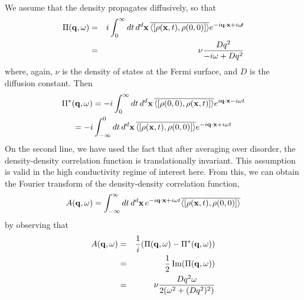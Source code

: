 \documentclass[prb,twocolumn]{revtex4}
\begin{document}
We assume that the density propagates diffusively, so that
\begin{eqnarray}
\Pi({\bf q},\omega)&=&i\int^{\infty}_{0}dt\,{d^d}{\bf x}\,\overline{\left\langle[\rho({\bf x},t),\rho(0,0)]\right\rangle}e^{-i{\bf q}\cdot{\bf x}+i\omega\!t}\cr
&=&\nu\frac{Dq^2}{-i\omega +Dq^2}
\end{eqnarray}
where, again, $\nu$ is the density of states at the Fermi surface, and $D$ is the diffusion
constant. Then
\begin{multline}
\Pi^{*}({\bf q},\omega) = -i\int^{\infty}_{0}dt\,{d^d}{\bf x}\,\overline{\left\langle[\rho(0,0),\rho({\bf x},t)]\right\rangle}e^{i{\bf q}\cdot{\bf x}-i\omega t}\\
=-i\int_{-\infty}^{0}dt\,{d^d}{\bf x}\,\overline{\left\langle[\rho({\bf x},t),\rho(0,0)]\right\rangle}
e^{-i{\bf q}\cdot{\bf x}+i\omega t}
\end{multline}
On the second line, we have used the fact that after averaging
over disorder, the density-density correlation function is
translationally invariant. This assumption is valid in the high
conductivity regime of interest here.
From this, we can obtain the Fourier transform of the density-density correlation function,
\begin{equation}
A({\bf q},\omega)=\int^{\infty}_{-\infty}dt\, {d^d}{\bf x}\,
e^{-i{\bf q}\cdot{\bf x}+i\omega t}\overline{\left\langle[\rho({\bf x},t),\rho(0,0)]\right\rangle}
\end{equation}
by observing that
\begin{eqnarray}
A({\bf q},\omega)&=&\frac{1}{i}(\Pi({\bf q},\omega)-\Pi^{*}({\bf q},\omega))\\
\nonumber &=&\frac{1}{2}\,{\rm Im}(\Pi({\bf q},\omega))\\ \nonumber
&=&\nu\frac{Dq^2\omega}{2(\omega^2+(Dq^2)^2)}
\end{eqnarray}
\end{document}
